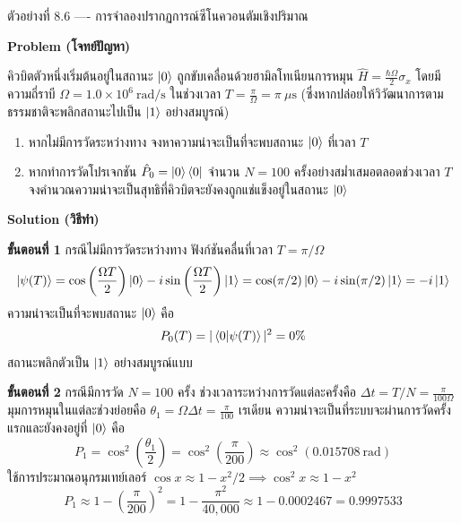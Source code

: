 \begin{psctbox}{ตัวอย่างที่ 8.6 ---- การจำลองปรากฏการณ์ซีโนควอนตัมเชิงปริมาณ}

\textbf{Problem (โจทย์ปัญหา)}

คิวบิตตัวหนึ่งเริ่มต้นอยู่ในสถานะ $\ket{0}$ ถูกขับเคลื่อนด้วยฮามิลโทเนียนการหมุน $\hat{H} = \frac{\hbar\Omega}{2}\sigma_x$ โดยมีความถี่ราบี $\Omega = 1.0 \times 10^6~\text{rad/s}$ ในช่วงเวลา $T = \frac{\pi}{\Omega} = \pi~\mu\text{s}$ (ซึ่งหากปล่อยให้วิวัฒนาการตามธรรมชาติจะพลิกสถานะไปเป็น $\ket{1}$ อย่างสมบูรณ์)
\begin{enumerate}
    \item หากไม่มีการวัดระหว่างทาง จงหาความน่าจะเป็นที่จะพบสถานะ $\ket{0}$ ที่เวลา $T$
    \item หากทำการวัดโปรเจกชัน $\hat{P}_0 = \ket{0}\bra{0}$ จำนวน $N = 100$ ครั้งอย่างสม่ำเสมอตลอดช่วงเวลา $T$ จงคำนวณความน่าจะเป็นสุทธิที่คิวบิตจะยังคงถูกแช่แข็งอยู่ในสถานะ $\ket{0}$
\end{enumerate}

\textbf{Solution (วิธีทำ)}

\textbf{ขั้นตอนที่ 1} กรณีไม่มีการวัดระหว่างทาง
ฟังก์ชันคลื่นที่เวลา $T = \pi/\Omega$
\begin{equation*}
\ket{\psi(T)} = \cos\left(\frac{\Omega T}{2}\right)\ket{0} - i\sin\left(\frac{\Omega T}{2}\right)\ket{1} = \cos(\pi/2)\ket{0} - i\sin(\pi/2)\ket{1} = -i\ket{1}
\end{equation*}
ความน่าจะเป็นที่จะพบสถานะ $\ket{0}$ คือ
\begin{equation*}
P_0(T) = |\braket{0}{\psi(T)}|^2 = 0\%
\end{equation*}
สถานะพลิกตัวเป็น $\ket{1}$ อย่างสมบูรณ์แบบ

\textbf{ขั้นตอนที่ 2} กรณีมีการวัด $N = 100$ ครั้ง
ช่วงเวลาระหว่างการวัดแต่ละครั้งคือ $\Delta t = T/N = \frac{\pi}{100 \Omega}$
มุมการหมุนในแต่ละช่วงย่อยคือ $\theta_1 = \Omega \Delta t = \frac{\pi}{100}$ เรเดียน
ความน่าจะเป็นที่ระบบจะผ่านการวัดครั้งแรกและยังคงอยู่ที่ $\ket{0}$ คือ
\begin{equation*}
P_1 = \cos^2\left(\frac{\theta_1}{2}\right) = \cos^2\left(\frac{\pi}{200}\right) \approx \cos^2(0.015708~\text{rad})
\end{equation*}
ใช้การประมาณอนุกรมเทย์เลอร์ $\cos x \approx 1 - x^2/2 \implies \cos^2 x \approx 1 - x^2$
\begin{equation*}
P_1 \approx 1 - \left(\frac{\pi}{200}\right)^2 = 1 - \frac{\pi^2}{40,000} \approx 1 - 0.0002467 = 0.9997533
\end{equation*}


\end{psctbox}
